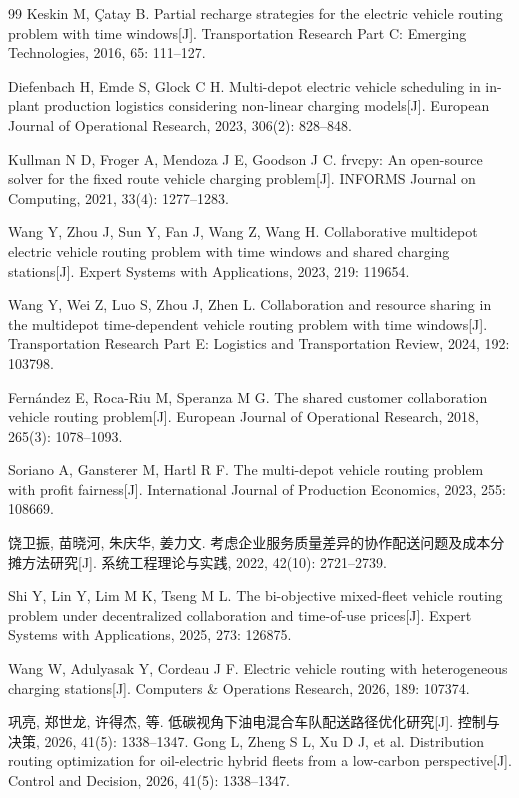 \documentclass{setp-new}
\begin{document}
\begin{thebibliography}{99}
 Keskin M, \c{C}atay B. Partial recharge strategies for the electric vehicle routing problem with time windows[J]. Transportation Research Part C: Emerging Technologies, 2016, 65: 111--127.

 Diefenbach H, Emde S, Glock C H. Multi-depot electric vehicle scheduling in in-plant production logistics considering non-linear charging models[J]. European Journal of Operational Research, 2023, 306(2): 828--848.

 Kullman N D, Froger A, Mendoza J E, Goodson J C. frvcpy: An open-source solver for the fixed route vehicle charging problem[J]. INFORMS Journal on Computing, 2021, 33(4): 1277--1283.

 Wang Y, Zhou J, Sun Y, Fan J, Wang Z, Wang H. Collaborative multidepot electric vehicle routing problem with time windows and shared charging stations[J]. Expert Systems with Applications, 2023, 219: 119654.

 Wang Y, Wei Z, Luo S, Zhou J, Zhen L. Collaboration and resource sharing in the multidepot time-dependent vehicle routing problem with time windows[J]. Transportation Research Part E: Logistics and Transportation Review, 2024, 192: 103798.

 Fern\'{a}ndez E, Roca-Riu M, Speranza M G. The shared customer collaboration vehicle routing problem[J]. European Journal of Operational Research, 2018, 265(3): 1078--1093.

 Soriano A, Gansterer M, Hartl R F. The multi-depot vehicle routing problem with profit fairness[J]. International Journal of Production Economics, 2023, 255: 108669.

 饶卫振, 苗晓河, 朱庆华, 姜力文. 考虑企业服务质量差异的协作配送问题及成本分摊方法研究[J]. 系统工程理论与实践, 2022, 42(10): 2721--2739.

 Shi Y, Lin Y, Lim M K, Tseng M L. The bi-objective mixed-fleet vehicle routing problem under decentralized collaboration and time-of-use prices[J]. Expert Systems with Applications, 2025, 273: 126875.

 Wang W, Adulyasak Y, Cordeau J F. Electric vehicle routing with heterogeneous charging stations[J]. Computers \& Operations Research, 2026, 189: 107374.

 巩亮, 郑世龙, 许得杰, 等. 低碳视角下油电混合车队配送路径优化研究[J]. 控制与决策, 2026, 41(5): 1338--1347.\newline
Gong L, Zheng S L, Xu D J, et al. Distribution routing optimization for oil-electric hybrid fleets from a low-carbon perspective[J]. Control and Decision, 2026, 41(5): 1338--1347.


\end{thebibliography}
\end{document}
